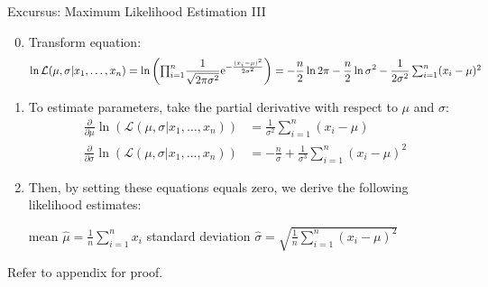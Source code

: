 \begin{frame}{Excursus: Maximum Likelihood Estimation III}
	\begin{enumerate}
		\setcounter{enumi}{-1}
		\item Transform equation:
		      \vspace*{-1em}
		      \begin{equation*}
			      \ln \mathcal{L}(\mu, \sigma | x_1, \dots, x_n) = \ln{\bigg({\textstyle\prod\nolimits_{i=1}^n} \frac{1}{\sqrt{2\pi \sigma^2}} {\rm e}^{-\frac{(x_i-\mu)^2}{2\sigma^2}}\bigg)}= -\frac{n}{2}\ln{2\pi}-\frac{n}{2}\ln{\sigma^2}-\frac{1}{2\sigma^2}\textstyle\sum\nolimits_{i=1}^n (x_i - \mu)^2
		      \end{equation*}
		\item To estimate parameters, take the partial derivative with respect to $\mu$ and $\sigma$:
		      \vspace*{-1em}
		      \begin{align*}
			      \textstyle\frac{\partial}{\partial \mu}\ln{(\mathcal{L}(\mu, \sigma|x_1, \dots, x_n))}    & = \frac{1}{\sigma^2} \sum_{i=1}^n (x_i -\mu)                            \\
			      \textstyle\frac{\partial}{\partial \sigma}\ln{(\mathcal{L}(\mu, \sigma|x_1, \dots, x_n))} & =-\textstyle\frac{n}{\sigma}+\frac{1}{\sigma^3}\sum_{i=1}^n (x_i-\mu)^2
		      \end{align*}
		\item Then, by setting these equations equals zero, we derive the following likelihood estimates:
		      \begin{center}
			      mean $\widehat{\mu}=\frac{1}{n}\sum\nolimits_{i=1}^n x_i$ \hspace{3em} standard deviation $\widehat{\sigma}=\sqrt{\frac{1}{n}\sum\nolimits_{i=1}^n (x_i-\mu)^2}$
		      \end{center}
	\end{enumerate}
	\begin{flushright}
		{\color{gray}Refer to appendix for proof.}
	\end{flushright}
\end{frame}

